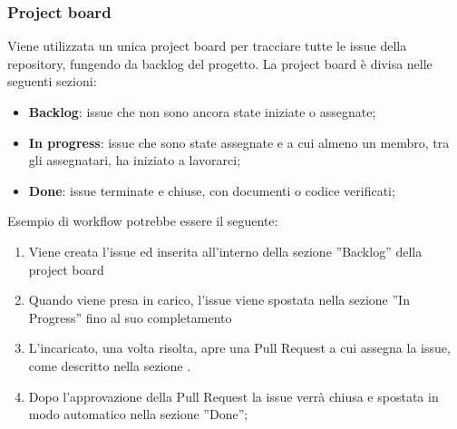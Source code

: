         \subsubsection{Project board}
        Viene utilizzata un unica project board per tracciare tutte le issue della repository, fungendo da backlog del progetto.
        La project board è divisa nelle seguenti sezioni:
        \begin{itemize}
            \item \textbf{Backlog}: issue che non sono ancora state iniziate o assegnate;
            \item \textbf{In progress}: issue che sono state assegnate e a cui almeno un membro, tra gli assegnatari, ha iniziato a lavorarci;
            \item \textbf{Done}: issue terminate e chiuse, con documenti o codice verificati;
        \end{itemize}
        Esempio di workflow potrebbe essere il seguente:
        \begin{enumerate}
            \item Viene creata l'issue ed inserita all'interno della sezione ”Backlog” della project board
            \item Quando viene presa in carico, l'issue viene spostata nella sezione ”In Progress” fino al suo completamento
            \item L'incaricato, una volta risolta, apre una Pull Request a cui assegna la issue, come descritto nella sezione .
            \item Dopo l'approvazione della Pull Request la issue verrà chiusa e spostata in modo automatico nella sezione ”Done”;
        \end{enumerate}



